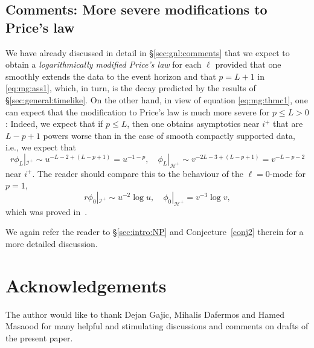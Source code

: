\documentclass[11pt,english]{article}
\numberwithin{equation}{section}
\theoremstyle{remark}
\theoremstyle{plain}
\theoremstyle{remark}
\renewcommand{\(}{\left(}
\renewcommand{\)}{\right)}
\begin{document}
\subsection{Comments: More severe modifications to Price's law}\label{sec:10comments}
We have already discussed in detail in \S \ref{sec:gnl:comments} that we expect to obtain a \textit{logarithmically modified Price's law} for each $\ell$ provided that one smoothly extends the data to the event horizon and that $p=L+1$ in \eqref{eq:mg:ass1}, which, in turn, is the decay predicted by the results of \S \ref{sec:general:timelike}.
On the other hand, in view of equation \eqref{eq:mg:thmc1}, one can expect that the modification to Price's law is much more severe for $p\leq L>0$: 
Indeed, we expect that if $p\leq L$, then one obtains asymptotics near $i^+$ that are $L-p+1$ powers worse than in the case of smooth compactly supported data, i.e., we expect that
\begin{equation}
r\phi_L|_{\mathcal{I}^+}\sim u^{-L-2+(L-p+1)}=u^{-1-p},\quad \phi_L|_{\mathcal{H}^+}\sim v^{-2L-3+(L-p+1)}=v^{-L-p-2}
\end{equation}
near $i^+$.
The reader should compare this to the behaviour of the $\ell=0$-mode for $p=1$, 
\begin{equation}
r\phi_0|_{\mathcal{I}^+}\sim u^{-2}\log u,\quad \phi_0|_{\mathcal{H}^+}=v^{-3}\log v,
\end{equation}
which was proved in~\cite{II}.
 
We again refer the reader to \S \ref{sec:intro:NP} and Conjecture~\ref{conj2} therein for a more detailed discussion.


\section*{Acknowledgements}
The author would like to thank Dejan Gajic, Mihalis Dafermos and Hamed Masaood for many helpful and stimulating discussions and comments on drafts of the present paper.
\newpage
\end{document}
